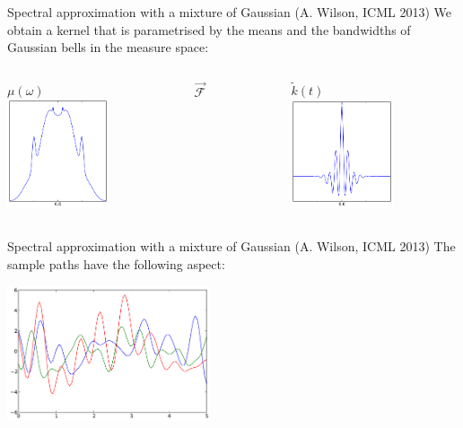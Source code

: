 \documentclass{beamer}
\begin{document}
\begin{frame}{Spectral approximation with a mixture of Gaussian (A. Wilson, ICML 2013)}
We obtain a kernel that is parametrised by the means and the bandwidths of Gaussian bells in the measure space:
\begin{columns}[c]
\begin{column}{5cm}
\begin{center}
$\mu(\omega)$ \\
\includegraphics[width=3cm]{figures/python/Bochner-wilsonmus}
\end{center}
\end{column}
\begin{column}{2cm}
\begin{center}
$\stackrel{\longrightarrow}{\mathcal{F}}$
\end{center}
\end{column}
\begin{column}{5cm}
\begin{center}
$\tilde{k}(t)$\\
\includegraphics[width=3cm]{figures/python/Bochner-wilsonks}
\end{center}
\end{column}
\end{columns}

\end{frame}

\begin{frame}{Spectral approximation with a mixture of Gaussian (A. Wilson, ICML 2013)}
The sample paths have the following aspect:\\
\vspace{5mm}
\begin{center}
\includegraphics[height=4cm]{figures/python/Bochner-wilsonktraj}
\end{center}
\end{frame}
\end{document}
